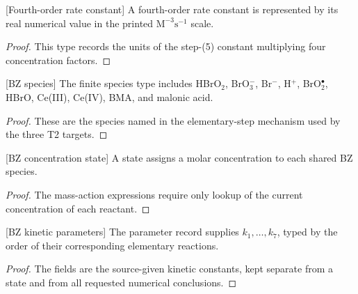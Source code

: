 \begin{definition}

[Fourth-order rate constant]
\label{def:chem:bz:fourth_order_rate_constant}
A fourth-order rate constant is represented by its real numerical value in
the printed $\mathrm{M^{-3}s^{-1}}$ scale.
\end{definition}
\begin{proof}

This type records the units of the step-(5) constant multiplying four
concentration factors.
\end{proof}

\begin{definition}

[BZ species]
\label{def:chem:bz:species}
The finite species type includes HBrO$_2$, BrO$_3^-$, Br$^-$, H$^+$,
BrO$_2^\bullet$, HBrO, Ce(III), Ce(IV), BMA, and malonic acid.
\end{definition}
\begin{proof}

These are the species named in the elementary-step mechanism used by the
three T2 targets.
\end{proof}

\begin{definition}

[BZ concentration state]
\label{def:chem:bz:state}
A state assigns a molar concentration to each shared BZ species.
\end{definition}
\begin{proof}

The mass-action expressions require only lookup of the current concentration
of each reactant.
\end{proof}

\begin{definition}

[BZ kinetic parameters]
\label{def:chem:bz:kinetic_parameters}
The parameter record supplies $k_1,\ldots,k_7$, typed by the order of their
corresponding elementary reactions.
\end{definition}
\begin{proof}

The fields are the source-given kinetic constants, kept separate from a state
and from all requested numerical conclusions.
\end{proof}

